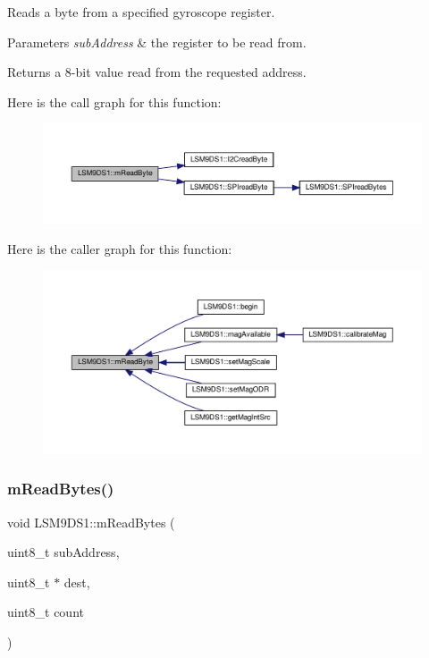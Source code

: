 Reads a byte from a specified gyroscope register. 


\begin{DoxyParams}{Parameters}
{\em sub\+Address} & the register to be read from. \\
\hline
\end{DoxyParams}
\begin{DoxyReturn}{Returns}
a 8-\/bit value read from the requested address. 
\end{DoxyReturn}
Here is the call graph for this function\+:\nopagebreak
\begin{figure}[H]
\begin{center}
\leavevmode
\includegraphics[width=350pt]{classLSM9DS1_ae4e470321567e4f93fc09f4cc6cd9efa_cgraph}
\end{center}
\end{figure}
Here is the caller graph for this function\+:\nopagebreak
\begin{figure}[H]
\begin{center}
\leavevmode
\includegraphics[width=350pt]{classLSM9DS1_ae4e470321567e4f93fc09f4cc6cd9efa_icgraph}
\end{center}
\end{figure}
\mbox{\label{classLSM9DS1_acfdf9862cad1e66c9fb61a17bfbe7477}} 
\subsubsection{\texorpdfstring{m\+Read\+Bytes()}{mReadBytes()}}
{\footnotesize\ttfamily void L\+S\+M9\+D\+S1\+::m\+Read\+Bytes (\begin{DoxyParamCaption}\item[{uint8\+\_\+t}]{sub\+Address,  }\item[{uint8\+\_\+t $\ast$}]{dest,  }\item[{uint8\+\_\+t}]{count }\end{DoxyParamCaption})\hspace{0.3cm}{\ttfamily [protected]}}



